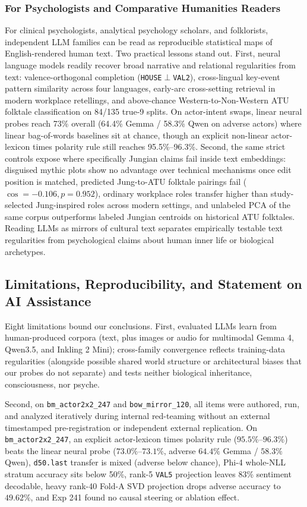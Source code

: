 \documentclass[conference]{IEEEtran}
\begin{document}
\subsubsection{For Psychologists and Comparative Humanities Readers}
For clinical psychologists, analytical psychology scholars, and folklorists, independent LLM families can be read as reproducible statistical maps of English-rendered human text. Two practical lessons stand out. First, neural language models readily recover broad narrative and relational regularities from text: valence-orthogonal completion (\texttt{HOUSE}$\perp$\texttt{VAL2}), cross-lingual key-event pattern similarity across four languages, early-arc cross-setting retrieval in modern workplace retellings, and above-chance Western-to-Non-Western ATU folktale classification on 84/135 true-9 splits. On actor-intent swaps, linear neural probes reach 73\% overall (64.4\% Gemma / 58.3\% Qwen on adverse actors) where linear bag-of-words baselines sit at chance, though an explicit non-linear actor-lexicon times polarity rule still reaches 95.5\%--96.3\%. Second, the same strict controls expose where specifically Jungian claims fail inside text embeddings: disguised mythic plots show no advantage over technical mechanisms once edit position is matched, predicted Jung-to-ATU folktale pairings fail ($\cos=-0.106, p=0.952$), ordinary workplace roles transfer higher than study-selected Jung-inspired roles across modern settings, and unlabeled PCA of the same corpus outperforms labeled Jungian centroids on historical ATU folktales. Reading LLMs as mirrors of cultural text separates empirically testable text regularities from psychological claims about human inner life or biological archetypes.

\subsection{Limitations, Reproducibility, and Statement on AI Assistance}
Eight limitations bound our conclusions. First, evaluated LLMs learn from human-produced corpora (text, plus images or audio for multimodal Gemma 4, Qwen3.5, and Inkling 2 Mini); cross-family convergence reflects training-data regularities (alongside possible shared world structure or architectural biases that our probes do not separate) and tests neither biological inheritance, consciousness, nor psyche.

Second, on \texttt{bm\_actor2x2\_247} and \texttt{bow\_mirror\_120}, all items were authored, run, and analyzed iteratively during internal red-teaming without an external timestamped pre-registration or independent external replication. On \texttt{bm\_actor2x2\_247}, an explicit actor-lexicon times polarity rule ($95.5\%$--$96.3\%$) beats the linear neural probe ($73.0\%$--$73.1\%$, adverse $64.4\%$ Gemma / $58.3\%$ Qwen), \texttt{d50.last} transfer is mixed (adverse below chance), Phi-4 whole-NLL stratum accuracy sits below 50\%, rank-5 \texttt{VAL5} projection leaves 83\% sentiment decodable, heavy rank-40 Fold-A SVD projection drops adverse accuracy to $49.62\%$, and Exp 241 found no causal steering or ablation effect.
\end{document}
